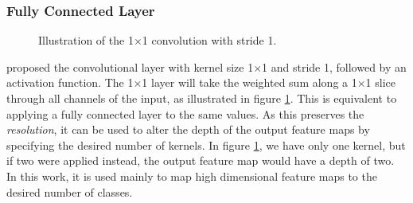 \subsubsection{Fully Connected Layer}
    \begin{figure}[H]
        \centering
        
        \caption[1×1 convolution]{Illustration of the 1×1 convolution with stride 1.}
      	\medskip 
        \label{1x1_fig}
    \end{figure}
    \citeauthor{lin2013network_in_network_1x1}\cite{lin2013network_in_network_1x1} proposed the convolutional layer with kernel size 1×1 and stride 1, followed by an activation function. The 1×1 layer will take the weighted sum along a 1×1 slice through all channels of the input, as illustrated in figure \ref{1x1_fig}. This is equivalent to applying a fully connected layer to the same values. As this preserves the \textit{resolution}, it can be used to alter the depth of the output feature maps by specifying the desired number of kernels. In figure \ref{1x1_fig}, we have only one kernel, but if two were applied instead, the output feature map would have a depth of two. In this work, it is used mainly to map high dimensional feature maps to the desired number of classes.
    
    

